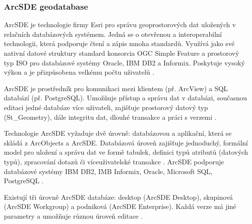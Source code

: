         \subsubsection{ArcSDE geodatabase}
        \label{ArcSDE}
        ArcSDE je technologie firmy Esri pro správu geoprostorových dat uložených v
        relačních databázových systémem. Jedná se o otevřenou a interoperabilní
        technologii, která podporuje čtení a zápis mnoha standardů. Využívá jako své
        nativní datové struktury standard konsorcia OGC Simple Feature a prostorový typ
        ISO pro databázové systémy Oracle, IBM DB2 a Informix. Poskytuje vysoký výkon a
        je přizpůsobena velkému počtu uživatelů \citep{Esri2006}.

        ArcSDE je prostředník pro komunikaci mezi klientem (př. ArcView) a SQL databází
        (př. PostgreSQL). Umožňuje přístup a správu dat v databázi, současnou editaci
        jedné databáze více uživateli, zajišťuje prostorový datový typ (St\_Geometry),
        dále integritu dat, dlouhé transakce a práci s verzemi \citep{Law2008}.

        Technologie ArcSDE vyžaduje dvě úrovně: databázovou a aplikační, která se
        skládá z ArcObjects a ArcSDE. Databázová úroveň zajišťuje jednoduchý, formální
        model pro uložení a správu dat ve formě tabulek, definici typů atributů
        (datových typů), zpracování dotazů či víceuživatelské transakce
        \citep{Law2008}. ArcSDE podporuje databázové systémy IBM DB2, IMB Informix,
        Oracle, Microsoft SQL, PostgreSQL \citep{Esri2013a}.

        Existují tři úrovně ArcSDE databáze: desktop (ArcSDE Desktop), skupinová
        (ArcSDE Workgroup) a podniková (ArcSDE Enterprise). Každá verze má jiné
        parametry a umožňuje různou úroveň editace . 

